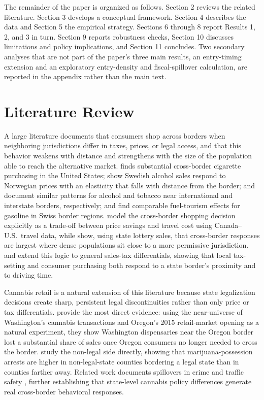 \documentclass[12pt]{article}
\begin{document}
The remainder of the paper is organized as follows. Section 2 reviews the related literature. Section 3
develops a conceptual framework. Section 4 describes the data and Section 5 the empirical strategy. Sections
6 through 8 report Results 1, 2, and 3 in turn. Section 9 reports robustness checks, Section 10 discusses
limitations and policy implications, and Section 11 concludes. Two secondary analyses that are not part of
the paper's three main results, an entry-timing extension and an exploratory entry-density and fiscal-spillover
calculation, are reported in the appendix rather than the main text.

\section{Literature Review}

A large literature documents that consumers shop across borders when neighboring jurisdictions differ in
taxes, prices, or legal access, and that this behavior weakens with distance and strengthens with the size
of the population able to reach the alternative market. \citet{Lovenheim2008} finds substantial cross-border
cigarette purchasing in the United States; \citet{AsplundFribergWilander2007} show Swedish alcohol sales
respond to Norwegian prices with an elasticity that falls with distance from the border;
\citet{BeattyLarsenSommervoll2009} and \citet{Stehr2007} document similar patterns for alcohol and tobacco
near international and interstate borders, respectively; and \citet{BanfiFilippiniHunt2005} find comparable
fuel-tourism effects for gasoline in Swiss border regions. \citet{ChandraHeadTappata2014} model the
cross-border shopping decision explicitly as a trade-off between price savings and travel cost using
Canada--U.S.\ travel data, while \citet{KnightSchiff2012} show, using state lottery sales, that cross-border
responses are largest where dense populations sit close to a more permissive jurisdiction.
\citet{Agrawal2015} and \citet{BakerJohnsonKueng2021} extend this logic to general sales-tax differentials,
showing that local tax-setting and consumer purchasing both respond to a state border's proximity and to
driving time.

Cannabis retail is a natural extension of this literature because state legalization decisions create sharp,
persistent legal discontinuities rather than only price or tax differentials. \citet{HansenMillerWeber2020}
provide the most direct evidence: using the near-universe of Washington's cannabis transactions and Oregon's
2015 retail-market opening as a natural experiment, they show Washington dispensaries near the Oregon border
lost a substantial share of sales once Oregon consumers no longer needed to cross the border.
\citet{HaoCowan2020} study the non-legal side directly, showing that marijuana-possession arrests are higher
in non-legal-state counties bordering a legal state than in counties farther away. Related work documents
spillovers in crime and traffic safety \citep{WuBoatengLang2020,Moyer2026}, further establishing that
state-level cannabis policy differences generate real cross-border behavioral responses.
\end{document}
